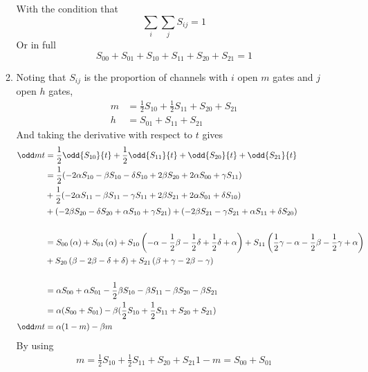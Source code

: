 \documentclass{X:/Documents/Coding/Latex/myassignment}
\begin{document}
\begin{enumerate}
\begin{enumerate}
		With the condition that 
		\[\sum_{i} \sum_{j} S_{ij} = 1\]
		Or in full
		\[S_{00} + S_{01} + S_{10} + S_{11} + S_{20} + S_{21} = 1\]


		\item
		Noting that $S_{ij}$ is the proportion of channels with $i$ open $m$ gates and $j$ open $h$ gates,
		\begin{align*}
			m &= \frac12 S_{10} + \frac12 S_{11} + S_{20} + S_{21}\\
			h &= S_{01} + S_{11} + S_{21}
		\end{align*}
		And taking the derivative with respect to $t$ gives
		\begin{align*}
			\odd m t &= \frac12\odd{S_{10}}{t} + \frac12\odd{S_{11}}{t} + \odd{S_{20}}{t} + \odd{S_{21}}{t}\\
			&= \frac12(- 2\alpha S_{10} -\beta S_{10} - \delta S_{10} + 2 \beta S_{20} + 2\alpha S_{00} +  \gamma S_{11})\\
			&+ \frac12(-2\alpha S_{11} -\beta S_{11} - \gamma S_{11} + 2 \beta S_{21} + 2\alpha S_{01} +  \delta S_{10}) \\
			&+ \left(- 2\beta S_{20} - \delta S_{20} + \alpha S_{10} + \gamma S_{21} \right) +  \left( - 2\beta S_{21} - \gamma S_{21} + \alpha S_{11} + \delta S_{20}\right)\\\\
			&= S_{00} \left(\alpha\right) + S_{01} \left(\alpha\right) + S_{10} \left(- \alpha - \frac12\beta - \frac12\delta + \frac12\delta + \alpha\right) + S_{11}\left(\frac12\gamma - \alpha - \frac12\beta - \frac12\gamma + \alpha\right) \\
			&+ S_{20} \left(\beta - 2 \beta - \delta +  \delta\right) + S_{21} \left(\beta +  \gamma - 2 \beta - \gamma\right)\\\\
			&= \alpha S_{00} + \alpha S_{01} - \frac12 \beta S_{10} - \beta S_{11} - \beta S_{20} - \beta S_{21}\\
			&= \alpha(S_{00} + S_{01}) - \beta (\frac12S_{10} + \frac12 S_{11} + S_{20} + S_{21})\\
			\odd mt &= \alpha(1-m) - \beta m
		\end{align*}
		By using 
		\begin{align*}
			m = \frac12 S_{10} + \frac12 S_{11} + S_{20} + S_{21}
			1 - m = S_{00} + S_{01}\\
		\end{align*}


\end{enumerate}
\end{enumerate}
\end{document}
